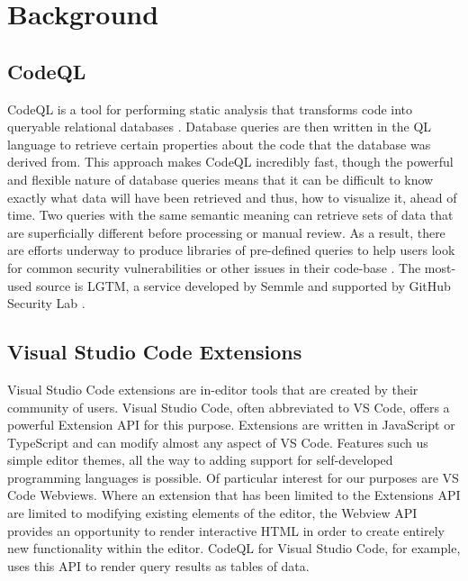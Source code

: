 \documentclass[sigplan,10pt,review]{acmart}
\begin{document}
\section{Background}

\subsection{CodeQL}
CodeQL is a tool for performing static analysis that transforms code into queryable relational databases \cite{Semmle_CodeQL_About}. Database queries are then written in the QL language to retrieve certain properties about the code that the database was derived from. This approach makes CodeQL incredibly fast, though the powerful and flexible nature of database queries means that it can be difficult to know exactly what data will have been retrieved and thus, how to visualize it, ahead of time.
\newline
\indent Two queries with the same semantic meaning can retrieve sets of data that are superficially different before processing or manual review. As a result, there are efforts underway to produce libraries of pre-defined queries to help users look for common security vulnerabilities or other issues in their code-base \cite{Semmle_LGTM}. The most-used source is LGTM, a service developed by Semmle and supported by GitHub Security Lab \cite{GitHub_SecurtyLab_CodeQL}.

\subsection{Visual Studio Code Extensions}
Visual Studio Code extensions are in-editor tools that are created by their community of users. Visual Studio Code, often abbreviated to VS Code, offers a powerful Extension API for this purpose. Extensions are written in JavaScript or TypeScript and can modify almost any aspect of VS Code. Features such us simple editor themes, all the way to adding support for self-developed programming languages is possible.
\newline
\indent Of particular interest for our purposes are VS Code Webviews. Where an extension that has been limited to the Extensions API are limited to modifying existing elements of the editor, the Webview API provides an opportunity to render interactive HTML in order to create entirely new functionality within the editor. CodeQL for Visual Studio Code, for example, uses this API to render query results as tables of data.
\end{document}
